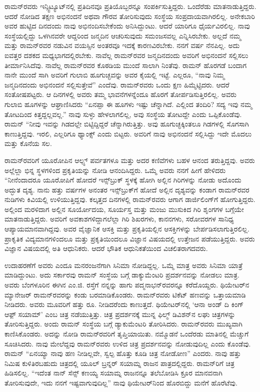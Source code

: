 ರಾಮನ್‌ರವರು ಇನ್ಸ್ಟಿಟ್ಯೂಟ್‌ನಲ್ಲಿ ಪ್ರತಿದಿನವೂ ಪ್ರತಿಯೊಬ್ಬರನ್ನೂ ಸಂಪರ್ಕಿಸುತ್ತಿದ್ದರು. ಒಂದೆರೆಡು ಮಾತನಾಡುತ್ತಿದ್ದರು. ಆದರೆ ನೋಡಿದ ತಕ್ಷಣ ಅಭಿನಂದನೆ ಅಥವಾ ಗೌರವ ತೋರಿಸುವುದು ಸಂಸ್ಥೆಯ ಸಂಪ್ರದಾಯವಾಗಿರಲಿಲ್ಲ. ಅನೇಕಬಾರಿ ಅವರ ಹುಟ್ಟಿದ ದಿನದಂದು ನಾವು ಅಭಿನಂದಿಸಬೇಕೆಂದು ಅನಿಸಿದ್ದುಂಟು. ಆದರೆ ಯಾರಿಗೂ ಧೈರ್ಯವಿರಲಿಲ್ಲ. ನಾವು ಸಂಸ್ಥೆಯಲ್ಲಿದ್ದು ಒಳಗಿನವರೇ ಆದ್ದರಿಂದ ಜನ್ಮದಿನ ಆಚರಿಸುವುದು ಸಮಂಜಸವಲ್ಲ ಎನ್ನಿಸಿರಬೇಕು. ಅಲ್ಲದೆ ನಮ್ಮ ಮತ್ತು ರಾಮನ್‌ರವರ ನಡುವಿನ ವಯಸ್ಸಿನ ಅಂತರವೂ ಇದಕ್ಕೆ ಕಾರಣವಿರಬೇಕು. ನನಗೆ ವರ್ಷ ನೆನಪಿಲ್ಲ. ಅದು ಐವತ್ತರ ದಶಕದ ಮಧ್ಯಭಾಗದಲ್ಲಿರಬೇಕು. ನಾವೆಲ್ಲ ರಾಮನ್‌ರವರ ಜನ್ಮದಿನದಂದು ಅವರಿಗೆ ಅಭಿನಂದನೆ ಸಲ್ಲಿಸಲು ತೀರ್ಮಾನಿಸಿದೆವು. ನಾವೆಲ್ಲ ರಾಮನ್‌ರವರ ಕೊಠಡಿಯ ಮುಂದೆ ಸಾಲಾಗಿ ನಿಂತೆವು. ರಾಮನ್ ಹೊರಗಡೆ ಬಂದಾಗ ನಾನೇ ಮುಂದೆ ಸಾಗಿ ಅವರಿಗೆ ಗುಲಾಬಿ ಹೂಗುಚ್ಛವನ್ನು ಅವರ ಕೈಯಲ್ಲಿ ಇಟ್ಟೆ. ಎಲ್ಲರೂ, “ನಾವು ನಿಮ್ಮ ಜನ್ಮದಿನದಂದು ಅಭಿನಂದನೆ ಸಲ್ಲಿಸುತ್ತೇವೆ” ಎಂದೆವು. ರಾಮನ್‌ರವರು ಒಂದು ಕ್ಷಣ ಹಿಮ್ಮೆಟ್ಟಿದರು. ಆದರೆ ಸಂತೋಷಪಟ್ಟರು. ಆ ದಿನಗಳಲ್ಲಿ ಅವರು ತಮ್ಮ ಭಾವನೆಗಳನ್ನೆಂದೂ ಹೊರಗೆ ತೋರ್ಪಡಿಸುತ್ತಿರಲಿಲ್ಲ. ಅವರು ಗುಲಾಬಿ ಹೂಗಳನ್ನು ಆಘ್ರಾಣಿಸಿದರು “ಏನಪ್ಪಾ ಈ ಹೂಗಳು ಇಷ್ಟು ಚೆನ್ನಾಗಿದೆ. ಎಲ್ಲಿಂದ ತಂದಿರಿ? ಸದ್ಯ ಇವು ನಮ್ಮ ತೋಟದಿಂದ ಕಿತ್ತದ್ದಲ್ಲವಲ್ಲ.” ನಾವು ಸುಳ್ಳು ಹೇಳಲಾಗಲಿಲ್ಲ, ಅವು ಸಂಸ್ಥೆಯ ತೋಟದ್ದೇ ಎಂದು ಒಪ್ಪಿಕೊಂಡೆವು. ರಾಮನ್ “ನೀವು ಇವನ್ನು ಗಿಡದಲ್ಲೇ ಬಿಟ್ಟಿದ್ದಿದ್ದರೆ ಚೆನ್ನಾಗಿರುತ್ತಿತ್ತು. ಅವು ಹೂಗುಚ್ಛಕ್ಕಿಂತಲೂ ಗಿಡಗಳಲ್ಲಿ ಸೊಗಸಾಗಿ ಕಾಣುತ್ತಿದ್ದವು. ಇರಲಿ, ಎಲ್ಲರಿಗೂ ಥ್ಯಾಂಕ್ಸ್ ಎಂದು ಬಿಟ್ಟರು. ಅವರಿಗೆ ನಾವು ಅಭಿನಂದನೆ ಸಲ್ಲಿಸಿದ್ದು ಇದೇ ಮೊದಲು ಮತ್ತು ಕೊನೆಯ ಸಲ.

ರಾಮನ್‍ರವರಿಗೆ ಯೂರೋಪಿನ ಆಲ್ಪ್ಸ್ ಪರ್ವತಗಳೂ ಮತ್ತು ಅದರ ಕಣಿವೆಗಳು ಬಹಳ ಆನಂದ ತರುತ್ತಿದ್ದವು. ಅವರು ಅಲ್ಲೆಲ್ಲಾ ಭಿನ್ನ ಸ್ಥಳಗಳಿಂದ ಪ್ರಕೃತಿಯನ್ನು ನೋಡಿ ಆನಂದಿಸಿದ್ದರು. ಒಮ್ಮೆ ಅವರು ನನಗೆ ಹೀಗೆ ಹೇಳಿದರು\enginline{--} “ನೀನೆಂದಾದರೂ ಯೂರೋಪಿಗೆ ಹೋದರೆ ಇನ್ಸ್‌ಬ್ರುಕ್ ಸ್ಥಳಕ್ಕೆ ಹೋಗಿ ಅಲ್ಲಿನ ಗಿರಿಗಳನ್ನು ನೋಡು ಅದೊಂದು ಅದ್ಭುತ ದೃಶ್ಯ. ನಾನು ಹತ್ತು ವರ್ಷಗಳ ಅನಂತರ ಇನ್ಸ್‌ಬ್ರುಕ್‌ಗೆ ಹೋದೆ ಅಲ್ಲಿನ ದೃಶ್ಯವನ್ನು ಕಂಡಾಗ ರಾಮನ್‌ರವರ ನುಡಿಗಳು ಕಿವಿಯಲ್ಲಿ ಉಳಿಯುತ್ತಿದ್ದವು. ಕಲ್ಕತ್ತದ ದಿನಗಳಲ್ಲಿ ರಾಮನ್‌ರವರು ಆಗಾಗ ಡಾರ್ಜಿಲಿಂಗ್‌ಗೆ ಹೋಗುತ್ತಿದ್ದರು. ಅಲ್ಲಿಂದ ಮರಳಿದಾಗ ಅಲ್ಲಿನ ಸೂರ್ಯೋದಯ, ಸೂರ್ಯಸ್ತ ಮತ್ತು ಮಂಜು ಮುಸುಕಿದ ಗಿರಿ ಶೃಂಗಗಳ ಬಗ್ಗೆಯೇ ಮಾತನಾಡುತ್ತಿದ್ದರು. ಅವರಿಗೆ ಅವಕಾಶಗಳಿದ್ದಾಗಲೆಲ್ಲಾ ಗಿರಿ ಶಿಖರಗಳು, ಕಾನನಗಳು, ಸರೋವರಗಳ ಸಾನಿಧ್ಯ ಆಪ್ಯಾಯಮಾನವಾಗಿದ್ದವು. ಅವರ ವೈಜ್ಞಾನಿಕ ಆಸಕ್ತಿ ಮತ್ತು ಪ್ರಕೃತಿಯಲ್ಲಿನ ಆಸಕ್ತಿಗಳನ್ನು ಬೇರ್ಪಡಿಸಲಾಗುತ್ತಿರಲಿಲ್ಲ. ಪ್ರಾಕೃತಿಕ ವಿದ್ಯಮಾನಗಳಿಂದಲೂ ಮತ್ತು ಪ್ರಕೃತಿಯಿಂದಲೂ ವಿಜ್ಞಾನ ವಿಷಯದಲ್ಲಿ ಉತ್ತೇಜನ ಪಡೆಯುತ್ತಿದ್ದರು. ಅವರು ವಿಜ್ಞಾನ ವಿಷಯದಲ್ಲಿ ಅತಿ ಆಧುನಿಕರು. ಆದರೆ ಭೌತಿಕ ಆಧುನಿಕತೆಯಿಂದ ವಿಚಲಿತರಾಗದವರು.

ಉದಾಹರಣೆಗೆ ಅವರು ಎಂದೂ ಮನರಂಜನೆಗಾಗಿ ಸಿನಿಮಾ ನೋಡಿದ್ದಲ್ಲ. ಒಮ್ಮೆ ಮಾತ್ರ ಅವರು ಸಿನಿಮಾ ಯಾತ್ರೆ ಮಾಡಿದ್ದುಂಟು. ಅದು ಸರ್ಕಾರವು ರಾಮನ್ ಸಂಸ್ಥೆಯ ಬಗ್ಗೆ ಡಾಕ್ಯುಮೆಂಟರಿ ಪ್ರದರ್ಶನವನ್ನು ನೋಡಲು ಮಾತ್ರ. ಅವರು ಬೆಂಗಳೂರಿನ ಈಗಿನ ಎಂ.ಜಿ. ರಸ್ತೆಗೆ ನನ್ನನ್ನು ಹಾಗು ಪದ್ಮನಾಭನ್‌ರವರನ್ನೂ ಕರೆದೊಯ್ದರು. ಥಿಯೇಟರ್‌ನ ಮ್ಯಾನೇಜರ್ ರಾಮನ್‌ರವರನ್ನು ಕಂಡು ಬರಮಾಡಿಕೊಂಡರು. ರಾಮನ್‌ರವರು ಟಿಕೆಟ್ ಹಣವನ್ನು ಒತ್ತಾಯಮಾಡಿ ನೀಡಿದರು. ಅವರು ಮೂವರಿಗೆ ಹತ್ತು ರೂ. ನೀಡಿದರೆಂದು ಕಾಣುತ್ತದೆ. ಥಿಯೇಟರ್‌ನಲ್ಲಿ ‘ಆನಾ ಅಂಡ್ ದಿ ಕಿಂಗ್ ಆಫ಼್ ಸಯಾಮ್’ ಎಂಬ ಚಿತ್ರ ನಡೆಯುತ್ತಿತ್ತು. ಚಿತ್ರ ಪ್ರದರ್ಶನಕ್ಕೆ ಮುನ್ನ ಫಿಲ್ಮ್ ಡಿವಿಶನ್‌ನ ಲಘು ಚಿತ್ರಗಳನ್ನು ತೋರಿಸುತ್ತಿದ್ದರು. ಅಂದು ರಾಮನ್ ಸಂಸ್ಥೆಯ ಬಗ್ಗೆ ಡ್ಯಾಕುಮೆಂಟರಿ ತೋರಿಸಿದರು. ರಾಮನ್‌ರವರು ಮುಖ್ಯವಾಗಿ ಕಾಣಿಸಿಕೊಂಡರು. ಅದನ್ನು ನೋಡಿ ರಾಮನ್‍ರವರಿಗೆ ತೃಪ್ತಿಯಾಯಿತು. ನಮ್ಮೊಡನೆ ಒಂದೆರಡು ಮಾತಿನಲ್ಲಿ ಮೆಚ್ಚುಗೆ ಸೂಚಿಸಿದರು. ನಾವು ಮೇಲೆದ್ದವು ರಾಮನ್‌ರವರು ಉಳಿದ ಚಿತ್ರ ಪ್ರದರ್ಶನವನ್ನು ನೋಡುವುದಿಲ್ಲ ಎಂದು ಕೊಂಡೆವು. ರಾಮನ್ “ಏನಯ್ಯಾ ನಾವು ಹಣ ನೀಡಿಲ್ಲವೇ, ಸ್ವಲ್ಪ ಹೊತ್ತು ಕೂಡಿ ಚಿತ್ರ ನೋಡೋಣ” ಎಂದರು. ನಾವು ಹತ್ತು ನಿಮಿಷ ಕುಳಿತಿರಬಹುದು ಚಿತ್ರದಲ್ಲಿ ಯೂಲ್ ಬ್ರನ್ನರ್ ಸಯಾಮ್ನ ರಾಜನ ಪಾತ್ರದಲ್ಲಿದ್ದರು. ರಾಮನ್‌ರಿಗೆ ಚಿತ್ರ ಹಿಡಿಸಲಿಲ್ಲ. “ಇದೆಂತ ನಾನ್ ಸೆನ್ಸ್ ಕಣಯ್ಯ ಸಯಾಮ್ನ ರಾಜನನ್ನೂ ತಲೆಬೋಡಿಸಿ ಕ್ರೂರ ಮಾನವನಾಗಿ ತೋರಿಸುವುದೇ, ಇದು ನನಗೆ ಇಷ್ಟವಾಗುವುದಿಲ್ಲ” ನಾವು ಥಿಯೇಟರ್‌ನಿಂದ ಹೊರಬಿದ್ದು ಮನೆಗೆ ಹೊರೆಟೆವು.

